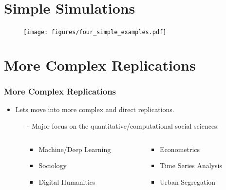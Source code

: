 \documentclass[12pt]{beamer}
\begin{document}
\section{Simple Simulations}
\begin{frame}
	\begin{center}
		\begin{figure}
			\texttt{[image: figures/four\_simple\_examples.pdf]}
		\end{figure}
	\end{center}
\end{frame}


\section{More Complex Replications}

\begin{frame}
\frametitle{More Complex Replications}
\begin{itemize}
    \item Lets move into more complex and direct replications.\vspace{.075in}
    \begin{itemize}
        \item[-] Major focus on the quantitative/computational social sciences.
            \begin{columns}
                \hspace{6em} %
                \begin{column}{0.44\textwidth}
                    \begin{itemize}
                       \item Machine/Deep Learning
                       \item Sociology
                       \item Digital Humanities
                    \end{itemize}
                \end{column}       
                \begin{column}{0.56\textwidth}
                    \begin{itemize}
                        \item Econometrics
                        \item Time Series Analysis
                        \item Urban Segregation
                    \end{itemize}
                \end{column}

\end{columns}
\end{itemize}
\end{itemize}
\end{frame}
\end{document}
